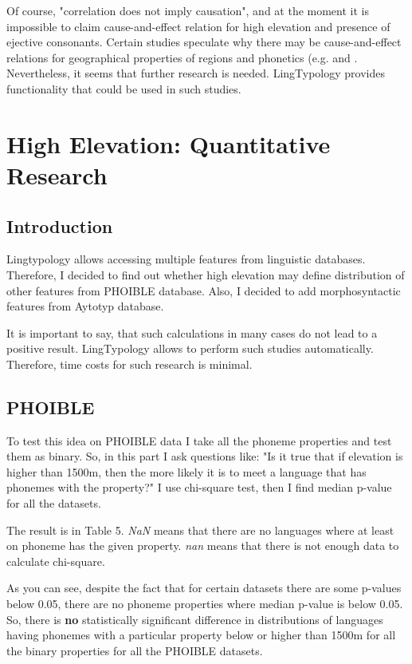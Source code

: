 \documentclass[a4paper,12pt]{article}
\begin{document}
Of course, "correlation does not imply causation", and at the moment it is impossible to claim cause-and-effect relation for high elevation and presence of ejective consonants. Certain studies speculate why there may be cause-and-effect relations for geographical properties of regions and phonetics (e.g. \parencite{ejectives} and \parencite{climatesSonorants}. Nevertheless, it seems that further research is needed. LingTypology provides functionality that could be used in such studies.

\newpage

\section{High Elevation: Quantitative Research}

\subsection{Introduction}
Lingtypology allows accessing multiple features from linguistic databases. Therefore, I decided to find out whether high elevation may define distribution of other features from PHOIBLE database. Also, I decided to add morphosyntactic features from Aytotyp database.

It is important to say, that such calculations in many cases do not lead to a positive result. LingTypology allows to perform such studies automatically. Therefore, time costs for such research is minimal.

\subsection{PHOIBLE}

To test this idea on PHOIBLE data I take all the phoneme properties and test them as binary. So, in this part I ask questions like: "Is it true that if elevation is higher than 1500m, then the more likely it is to meet a language that has phonemes with the property?" I use chi-square test, then I find median p-value for all the datasets.

The result is in Table 5. \textit{NaN} means that there are no languages where at least on phoneme has the given property. \textit{nan} means that there is not enough data to calculate chi-square.

As you can see, despite the fact that for certain datasets there are some p-values below 0.05, there are no phoneme properties where median p-value is below 0.05. So, there is \textbf{no} statistically significant difference in distributions of languages having phonemes with a particular property below or higher than 1500m for all the binary properties for all the PHOIBLE datasets.
\end{document}
